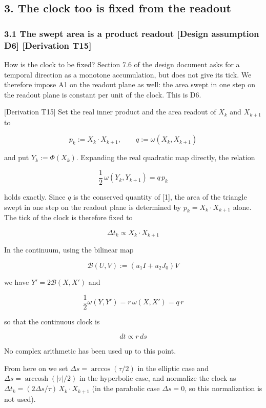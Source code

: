 \documentclass[
  a4paper,
]{article}
\begin{document}
\subsection{3. The clock too is fixed from the
readout}\label{the-clock-too-is-fixed-from-the-readout}

\subsubsection{3.1 The swept area is a product readout {[}Design
assumption D6{]} {[}Derivation
T15{]}}\label{the-swept-area-is-a-product-readout-design-assumption-d6-derivation-t15}

How is the clock to be fixed? Section 7.6 of the design document asks
for a temporal direction as a monotone accumulation, but does not give
its tick. We therefore impose A1 on the readout plane as well: the area
swept in one step on the readout plane is constant per unit of the
clock. This is D6.

{[}Derivation T15{]} Set the real inner product and the area readout of
\(X_k\) and \(X_{k+1}\) to

\[
p_k:=X_k\cdot X_{k+1},\qquad q:=\omega(X_k,X_{k+1})
\]

and put \(Y_k:=\Phi(X_k)\). Expanding the real quadratic map directly,
the relation

\[
\boxed{\;\frac12\,\omega(Y_k,Y_{k+1})=q\,p_k\;}
\]

holds exactly. Since \(q\) is the conserved quantity of {[}1{]}, the
area of the triangle swept in one step on the readout plane is
determined by \(p_k=X_k\cdot X_{k+1}\) alone. The tick of the clock is
therefore fixed to

\[
\boxed{\;\Delta t_k\propto X_k\cdot X_{k+1}\;}
\]

In the continuum, using the bilinear map

\[
\mathcal B(U,V):=(u_1I+u_2J_0)V
\]

we have \(Y'=2\mathcal B(X,X')\) and

\[
\boxed{\;\frac12\omega(Y,Y')=r\,\omega(X,X')=q\,r\;}
\]

so that the continuous clock is

\[
\boxed{\;dt\propto r\,ds\;}
\]

No complex arithmetic has been used up to this point.

From here on we set \(\Delta s=\arccos(\tau/2)\) in the elliptic case
and \(\Delta s=\operatorname{arccosh}(|\tau|/2)\) in the hyperbolic
case, and normalize the clock as
\(\Delta t_k=(2\Delta s/\tau)\,X_k\cdot X_{k+1}\) (in the parabolic case
\(\Delta s=0\), so this normalization is not used).
\end{document}
